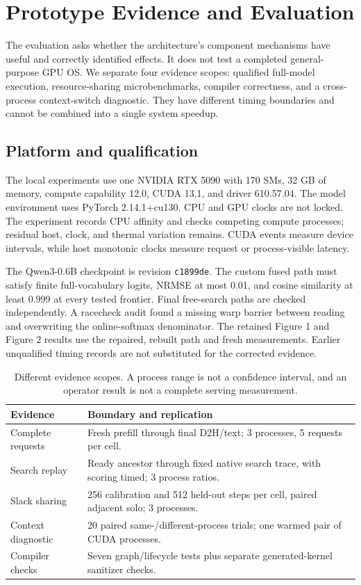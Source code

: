 \section{Prototype Evidence and Evaluation}
\label{sec:evidence}
The evaluation asks whether the architecture's component mechanisms have
useful and correctly identified effects. It does not test a completed
general-purpose GPU OS. We separate four evidence scopes: qualified full-model
execution, resource-sharing microbenchmarks, compiler correctness, and a
cross-process context-switch diagnostic. They have different timing boundaries
and cannot be combined into a single system speedup.

\subsection{Platform and qualification}
The local experiments use one NVIDIA RTX 5090 with 170 SMs, 32 GB of memory,
compute capability 12.0, CUDA 13.1, and driver 610.57.04. The model environment
uses PyTorch 2.14.1+cu130. CPU and GPU clocks are not locked. The experiment
records CPU affinity and checks competing compute processes; residual host,
clock, and thermal variation remains. CUDA events measure device intervals,
while host monotonic clocks measure request or process-visible latency.

The Qwen3-0.6B checkpoint is revision \texttt{c1899de}. The custom fused path
must satisfy finite full-vocabulary logits, NRMSE at most 0.01, and cosine
similarity at least 0.999 at every tested frontier. Final free-search paths
are checked independently. A racecheck audit found a missing warp barrier
between reading and overwriting the online-softmax denominator. The retained
Figure 1 and Figure 2 results use the repaired, rebuilt path and fresh
measurements. Earlier unqualified timing records are not substituted for
the corrected evidence.

\begin{table}[t]
\centering\small
\begin{tabular}{p{}p{}}
\toprule
Evidence & Boundary and replication \\
\midrule
Complete requests & Fresh prefill through final D2H/text; 3 processes, 5 requests per cell. \\
Search replay & Ready ancestor through fixed native search trace, with scoring timed; 3 process ratios. \\
Slack sharing & 256 calibration and 512 held-out steps per cell, paired adjacent solo; 3 processes. \\
Context diagnostic & 20 paired same-/different-process trials; one warmed pair of CUDA processes. \\
Compiler checks & Seven graph/lifecycle tests plus separate generated-kernel sanitizer checks. \\
\bottomrule
\end{tabular}
\caption{Different evidence scopes. A process range is not a confidence
interval, and an operator result is not a complete serving measurement.}
\label{tab:protocol}
\end{table}

